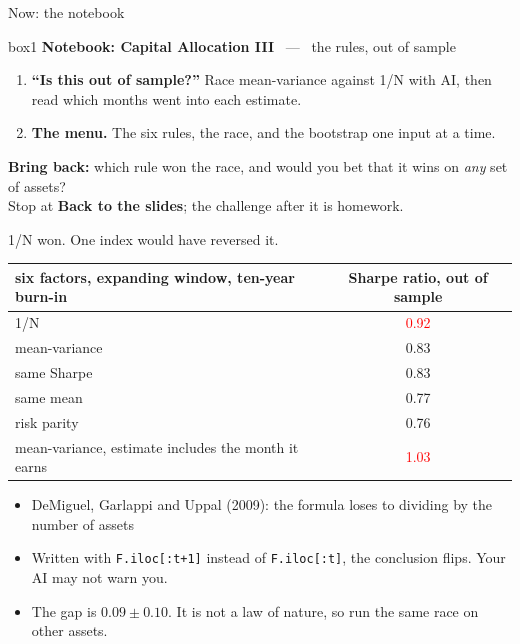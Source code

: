 \documentclass[aspectratio=169,10pt]{beamer}
\begin{document}
\begin{frame}{Now: the notebook}
\vskip 2pt
\begin{beamercolorbox}[rounded=true,sep=7pt,center]{box1}
\textbf{Notebook: Capital Allocation III} \ --- \ the rules, out of sample
\end{beamercolorbox}
\vskip 10pt
\begin{enumerate}
\item \textbf{``Is this out of sample?''} Race mean-variance against 1/N with AI, then read which months went into each estimate.
\vskip 5pt
\item \textbf{The menu.} The six rules, the race, and the bootstrap one input at a time.
\end{enumerate}
\vskip 8pt
{\small \textbf{Bring back:} which rule won the race, and would you bet that it wins on \emph{any} set of assets? \\[2pt]
Stop at \textbf{Back to the slides}; the challenge after it is homework.}
\end{frame}

\begin{frame}{1/N won. One index would have reversed it.}
\vskip 2pt
\begin{center}
\renewcommand{\arraystretch}{1.25}
\begin{tabular}{lc}
\toprule
six factors, expanding window, ten-year burn-in & Sharpe ratio, out of sample \\
\midrule
1/N & \textcolor{red}{0.92} \\
mean-variance & 0.83 \\
same Sharpe & 0.83 \\
same mean & 0.77 \\
risk parity & 0.76 \\
\midrule
mean-variance, estimate includes the month it earns & \textcolor{red}{1.03} \\
\bottomrule
\end{tabular}
\end{center}
\vskip 6pt
\begin{itemize}
\item DeMiguel, Garlappi and Uppal (2009): the formula loses to dividing by the number of assets
\vskip 4pt
\item Written with \texttt{F.iloc[:t+1]} instead of \texttt{F.iloc[:t]}, the conclusion flips. Your AI may not warn you.
\vskip 4pt
\item The gap is $0.09 \pm 0.10$. It is not a law of nature, so run the same race on other assets.
\end{itemize}
\end{frame}
\end{document}
